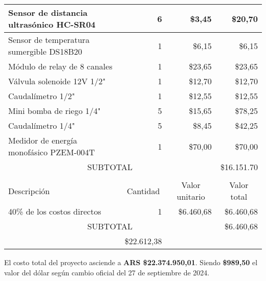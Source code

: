 \begin{table}[htpb]
\begin{tabularx}{\linewidth}{@{}|X|c|r|r|@{}}
		Sensor de distancia ultrasónico HC-SR04  & 
		\multicolumn{1}{r|}{6} & \multicolumn{1}{r|}{\$3,45} & \multicolumn{1}{r|}{\$20,70} \\ \hline
		Sensor de temperatura sumergible DS18B20  & 
		\multicolumn{1}{r|}{1} & \multicolumn{1}{r|}{\$6,15} & \multicolumn{1}{r|}{\$6,15} \\ \hline
		Módulo de relay de 8 canales  & 
		\multicolumn{1}{r|}{1} & \multicolumn{1}{r|}{\$23,65} & \multicolumn{1}{r|}{\$23,65} \\ \hline
		Válvula solenoide 12V 1/2"  & 
		\multicolumn{1}{r|}{1} & \multicolumn{1}{r|}{\$12,70} & \multicolumn{1}{r|}{\$12,70} \\ \hline
		Caudalímetro 1/2"  & 
		\multicolumn{1}{r|}{1} & \multicolumn{1}{r|}{\$12,55} & \multicolumn{1}{r|}{\$12,55} \\ \hline
		Mini bomba de riego 1/4"  & 
		\multicolumn{1}{r|}{5} & \multicolumn{1}{r|}{\$15,65} & \multicolumn{1}{r|}{\$78,25} \\ \hline
		Caudalímetro 1/4"  & 
		\multicolumn{1}{r|}{5} & \multicolumn{1}{r|}{\$8,45} & \multicolumn{1}{r|}{\$42,25} \\ \hline
		Medidor de energía monofásico PZEM-004T  & 
		\multicolumn{1}{r|}{1} & \multicolumn{1}{r|}{\$70,00} & \multicolumn{1}{r|}{\$70,00} \\ \hline
		
		\multicolumn{3}{|c|}{SUBTOTAL} & \multicolumn{1}{r|}{\$16.151.70} \\ \hline
		\rowcolor[HTML]{C0C0C0}
		\multicolumn{4}{|c|}{\cellcolor[HTML]{C0C0C0}COSTOS INDIRECTOS} \\ \hline
		\rowcolor[HTML]{C0C0C0}
		Descripción                                                 &
		\multicolumn{1}{c|}{\cellcolor[HTML]{C0C0C0}Cantidad}       &
		\multicolumn{1}{c|}{\cellcolor[HTML]{C0C0C0}Valor unitario} &
		\multicolumn{1}{c|}{\cellcolor[HTML]{C0C0C0}Valor total}        \\ \hline
		40\% de los costos directos   & 
		\multicolumn{1}{r|}{1} & \multicolumn{1}{r|}{\$6.460,68} & \multicolumn{1}{r|}{\$6.460,68} \\ \hline
		
		\multicolumn{3}{|c|}{SUBTOTAL}                              &
		\multicolumn{1}{r|}{\$6.460,68}                                           \\ \hline
		\rowcolor[HTML]{C0C0C0}
		\multicolumn{3}{|c|}{TOTAL}                                 & \$22.612,38
		\\ \hline
	\end{tabularx}%
\end{table}

\vspace{5mm}
El costo total del proyecto asciende a \textbf{ARS \$22.374.950,01}. Siendo \textbf{\$989,50} el valor del dólar según cambio oficial del 27 de septiembre de 2024.